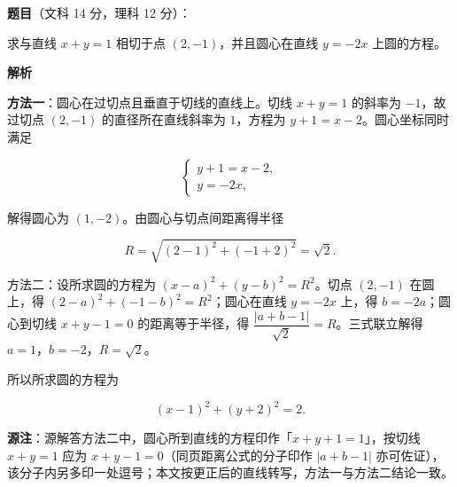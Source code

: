 \begin{answer}

\textbf{题目}（文科 14 分，理科 12 分）：

求与直线 $x+y=1$ 相切于点 $(2,-1)$，并且圆心在直线 $y=-2x$ 上圆的方程。

\textbf{解析}

\textbf{方法一}：圆心在过切点且垂直于切线的直线上。切线 $x+y=1$ 的斜率为 $-1$，故过切点 $(2,-1)$ 的直径所在直线斜率为 $1$，方程为 $y+1=x-2$。圆心坐标同时满足

\nopagebreak[4]
\[
\begin{cases}
y+1=x-2,\\
y=-2x,
\end{cases}
\]

解得圆心为 $(1,-2)$。由圆心与切点间距离得半径

\nopagebreak[4]
\[
R=\sqrt{(2-1)^2+(-1+2)^2}=\sqrt2.
\]

方法二：设所求圆的方程为 $(x-a)^2+(y-b)^2=R^2$。切点 $(2,-1)$ 在圆上，得 $(2-a)^2+(-1-b)^2=R^2$；圆心在直线 $y=-2x$ 上，得 $b=-2a$；圆心到切线 $x+y-1=0$ 的距离等于半径，得 $\dfrac{|a+b-1|}{\sqrt2}=R$。三式联立解得 $a=1$，$b=-2$，$R=\sqrt2$。

所以所求圆的方程为

\nopagebreak[4]
\[
(x-1)^2+(y+2)^2=2.
\]

\begin{gktip}
\textbf{源注}：源解答方法二中，圆心所到直线的方程印作「$x+y+1=1$」，按切线 $x+y=1$ 应为 $x+y-1=0$（同页距离公式的分子印作 $|a+b-1|$ 亦可佐证），该分子内另多印一处逗号；本文按更正后的直线转写，方法一与方法二结论一致。
\end{gktip}


\end{answer}
